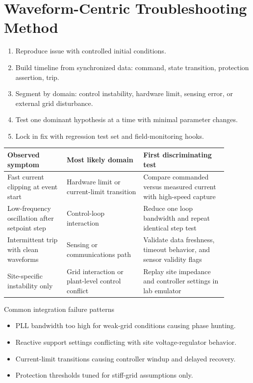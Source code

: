 \documentclass[11pt]{article}
\begin{document}
\section{Waveform-Centric Troubleshooting Method}

\begin{enumerate}
  \item Reproduce issue with controlled initial conditions.
  \item Build timeline from synchronized data: command, state transition, protection assertion, trip.
  \item Segment by domain: control instability, hardware limit, sensing error, or external grid disturbance.
  \item Test one dominant hypothesis at a time with minimal parameter changes.
  \item Lock in fix with regression test set and field-monitoring hooks.
\end{enumerate}

\begin{table}[h]
\centering
\begin{tabular}{p{0.24\linewidth}p{0.31\linewidth}p{0.34\linewidth}}
\toprule
Observed symptom & Most likely domain & First discriminating test \\
\midrule
Fast current clipping at event start & Hardware limit or current-limit transition & Compare commanded versus measured current with high-speed capture \\
Low-frequency oscillation after setpoint step & Control-loop interaction & Reduce one loop bandwidth and repeat identical step test \\
Intermittent trip with clean waveforms & Sensing or communications path & Validate data freshness, timeout behavior, and sensor validity flags \\
Site-specific instability only & Grid interaction or plant-level control conflict & Replay site impedance and controller settings in lab emulator \\
\bottomrule
\end{tabular}
\end{table}

\begin{warningbox}{Common integration failure patterns}
\begin{itemize}
  \item PLL bandwidth too high for weak-grid conditions causing phase hunting.
  \item Reactive support settings conflicting with site voltage-regulator behavior.
  \item Current-limit transitions causing controller windup and delayed recovery.
  \item Protection thresholds tuned for stiff-grid assumptions only.
\end{itemize}
\end{warningbox}
\end{document}
